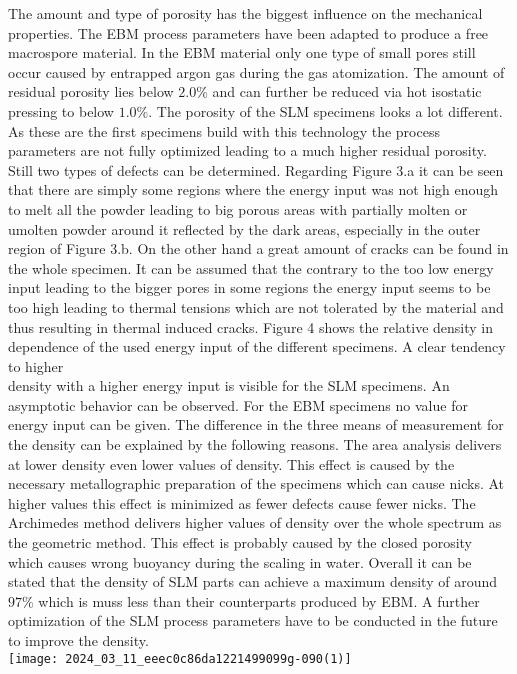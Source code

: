 \documentclass[10pt]{article}
\begin{document}
The amount and type of porosity has the biggest influence on the mechanical properties. The EBM process parameters have been adapted to produce a free macrospore material. In the EBM material only one type of small pores still occur caused by entrapped argon gas during the gas atomization. The amount of residual porosity lies below $2.0 \%$ and can further be reduced via hot isostatic pressing to below $1.0 \%$. The porosity of the SLM specimens looks a lot different. As these are the first specimens build with this technology the process parameters are not fully optimized leading to a much higher residual porosity. Still two types of defects can be determined. Regarding Figure 3.a it can be seen that there are simply some regions where the energy input was not high enough to melt all the powder leading to big porous areas with partially molten or umolten powder around it reflected by the dark areas, especially in the outer region of Figure 3.b. On the other hand a great amount of cracks can be found in the whole specimen. It can be assumed that the contrary to the too low energy input leading to the bigger pores in some regions the energy input seems to be too high leading to thermal tensions which are not tolerated by the material and thus resulting in thermal induced cracks. Figure 4 shows the relative density in dependence of the used energy input of the different specimens. A clear tendency to higher\\
density with a higher energy input is visible for the SLM specimens. An asymptotic behavior can be observed. For the EBM specimens no value for energy input can be given. The difference in the three means of measurement for the density can be explained by the following reasons. The area analysis delivers at lower density even lower values of density. This effect is caused by the necessary metallographic preparation of the specimens which can cause nicks. At higher values this effect is minimized as fewer defects cause fewer nicks. The Archimedes method delivers higher values of density over the whole spectrum as the geometric method. This effect is probably caused by the closed porosity which causes wrong buoyancy during the scaling in water. Overall it can be stated that the density of SLM parts can achieve a maximum density of around $97 \%$ which is muss less than their counterparts produced by EBM. A further optimization of the SLM process parameters have to be conducted in the future to improve the density.\\
\texttt{[image: 2024\_03\_11\_eeec0c86da1221499099g-090(1)]}
\end{document}
